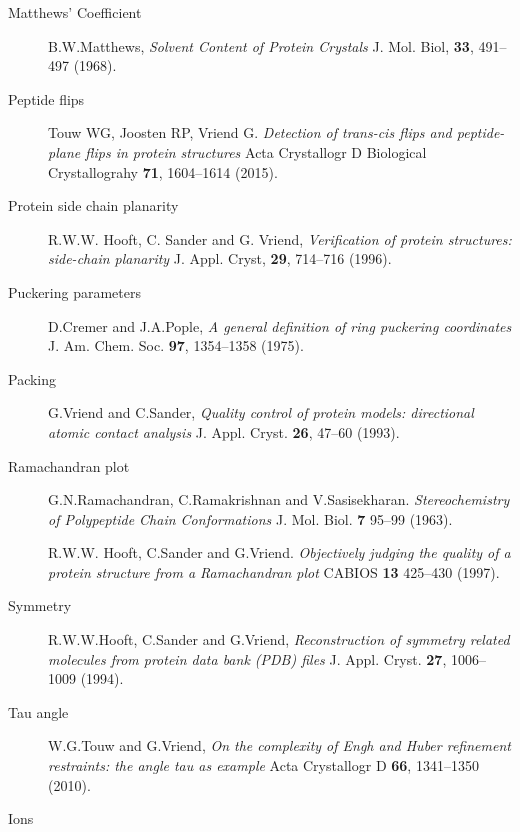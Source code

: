 \documentclass[a4paper]{article}
\begin{document}
\begin{description}
\item [Matthews' Coefficient]

B.W.Matthews,
{\em Solvent Content of Protein Crystals\/}
J. Mol. Biol, {\bf 33}, 491--497 (1968).

\item [Peptide flips]

Touw WG, Joosten RP, Vriend G.
{\em Detection of trans-cis flips and peptide-plane flips in protein
      structures\/}
Acta Crystallogr D Biological Crystallograhy {\bf 71}, 1604--1614 (2015).

\item [Protein side chain planarity]

R.W.W. Hooft, C. Sander and G. Vriend,
{\em Verification of protein structures: side-chain planarity\/}
J. Appl. Cryst, {\bf 29}, 714--716 (1996).

\item [Puckering parameters]

D.Cremer and J.A.Pople,
{\em A general definition of ring puckering coordinates\/}
J. Am. Chem. Soc. {\bf 97}, 1354--1358 (1975).

\item [Packing]

G.Vriend and C.Sander,
{\em Quality control of protein models: directional atomic
     contact analysis\/}
J. Appl. Cryst. {\bf 26}, 47--60 (1993).

\item [Ramachandran plot]

G.N.Ramachandran, C.Ramakrishnan and V.Sasisekharan.
{\em Stereochemistry of Polypeptide Chain Conformations\/}
J. Mol. Biol. {\bf 7} 95--99 (1963).

R.W.W. Hooft, C.Sander and G.Vriend.
{\em Objectively judging the quality of a protein structure from a
     Ramachandran plot\/}
CABIOS {\bf 13} 425--430 (1997).

\item [Symmetry]

R.W.W.Hooft, C.Sander and G.Vriend,
{\em Reconstruction of symmetry related molecules from protein
     data bank (PDB) files\/}
J. Appl. Cryst. {\bf 27}, 1006--1009 (1994).

\item [Tau angle]

W.G.Touw and G.Vriend,
{\em On the complexity of Engh and Huber refinement restraints: the angle
     tau as example\/}
Acta Crystallogr D {\bf 66}, 1341--1350 (2010).

\item [Ions]


\end{description}
\end{document}
